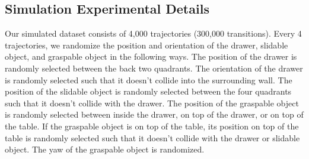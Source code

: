




\subsection{Simulation Experimental Details}
\label{appendix:simulation_experimental_details}
Our simulated dataset consists of 4,000 trajectories (300,000 transitions). Every 4 trajectories, we randomize the position and orientation of the drawer, slidable object, and graspable object in the following ways. The position of the drawer is randomly selected between the back two quadrants. The orientation of the drawer is randomly selected such that it doesn't collide into the surrounding wall. The position of the slidable object is randomly selected between the four quadrants such that it doesn't collide with the drawer. The position of the graspable object is randomly selected between inside the drawer, on top of the drawer, or on top of the table. If the graspable object is on top of the table, its position on top of the table is randomly selected such that it doesn't collide with the drawer or slidable object. The yaw of the graspable object is randomized. 


